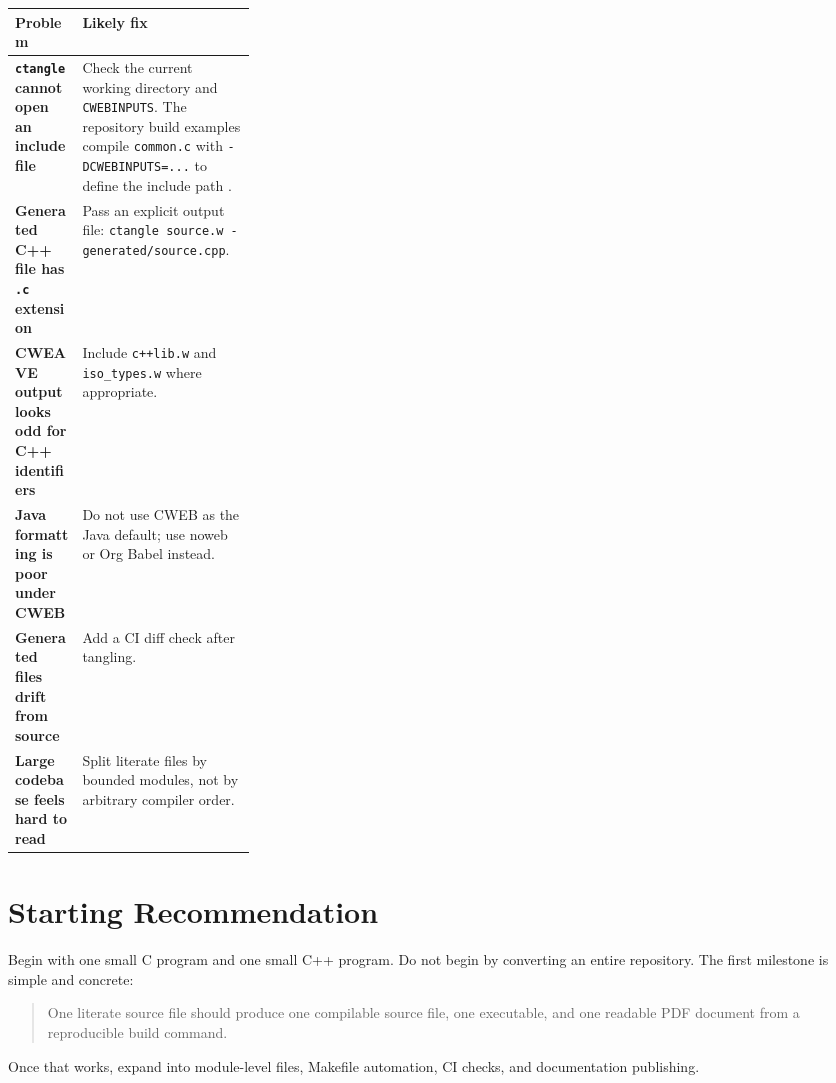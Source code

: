 \documentclass[11pt]{article}
\begin{document}
\begin{center}
\begin{tabularx}{0.96\linewidth}{>{\bfseries}p{0.28\linewidth} X}
\toprule
Problem & Likely fix \\
\midrule
\texttt{ctangle} cannot open an include file & Check the current working directory and \texttt{CWEBINPUTS}. The repository build examples compile \texttt{common.c} with \texttt{-DCWEBINPUTS=...} to define the include path \cite{repo-readme}. \\
Generated C++ file has \texttt{.c} extension & Pass an explicit output file: \texttt{ctangle source.w - generated/source.cpp}. \\
CWEAVE output looks odd for C++ identifiers & Include \texttt{c++lib.w} and \texttt{iso\_types.w} where appropriate. \\
Java formatting is poor under CWEB & Do not use CWEB as the Java default; use noweb or Org Babel instead. \\
Generated files drift from source & Add a CI diff check after tangling. \\
Large codebase feels hard to read & Split literate files by bounded modules, not by arbitrary compiler order. \\
\bottomrule
\end{tabularx}
\end{center}

\section{Starting Recommendation}

Begin with one small C program and one small C++ program. Do not begin by converting an entire repository. The first milestone is simple and concrete:

\begin{quote}
One literate source file should produce one compilable source file, one executable, and one readable PDF document from a reproducible build command.
\end{quote}

Once that works, expand into module-level files, Makefile automation, CI checks, and documentation publishing.
\end{document}
